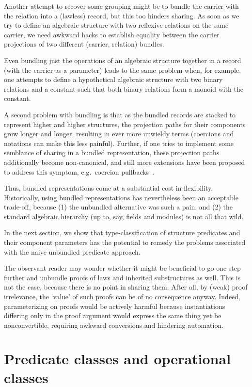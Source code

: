 \documentclass[a4paper,10pt,runningheads]{llncs}
\begin{document}
Another attempt to recover some grouping might be to bundle the carrier with the relation into a (lawless) record, but this too hinders sharing. As soon as we try to define an algebraic structure with two reflexive relations on the same carrier, we need awkward hacks to establish equality between the carrier projections of two different (carrier, relation) bundles.

Even bundling just the operations of an algebraic structure together in a record (with the carrier as a parameter) leads to the same problem when, for example, one attempts to define a hypothetical algebraic structure with two binary relations and a constant such that both binary relations form a monoid with the constant.

A second problem with bundling is that as the bundled records are stacked to represent higher and higher structures, the projection paths for their components grow longer and longer, resulting in ever more unwieldy terms (coercions and notations can make this less painful). Further, if one tries to implement some semblance of sharing in a bundled representation, these projection paths additionally become non-canonical, and still more extensions have been proposed to address this symptom, e.g.\ coercion pullbacks~\cite{Hints}.

Thus, bundled representations come at a substantial cost in flexibility. Historically, using bundled representations has nevertheless been an acceptable trade-off, because (1) the unbundled alternative was such a pain, and (2) the standard algebraic hierarchy (up to, say, fields and modules) is not all that wild.

In the next section, we show that type-classification of structure predicates and their component parameters has the potential to remedy the problems associated with the naive unbundled predicate approach.

The observant reader may wonder whether it might be beneficial to go one step further and unbundle proofs of laws and inherited substructures as well. This is not the case, because there is no point in sharing them. After all, by (weak) proof irrelevance, the `value' of such proofs can be of no consequence anyway. Indeed, parameterizing on proofs would be actively harmful because instantiations differing only in the proof argument would express the same thing yet be nonconvertible, requiring awkward conversions and hindering automation.

\section{Predicate classes and operational classes}\label{predicateclasses}
\end{document}
